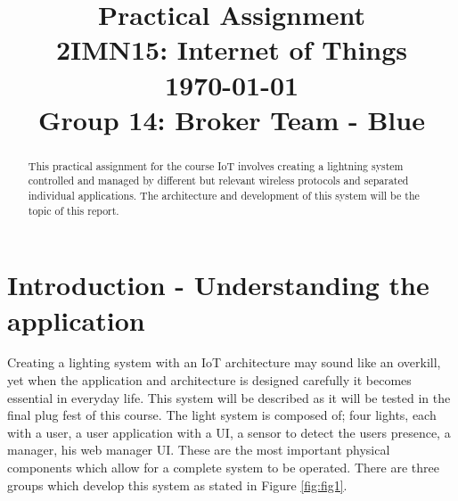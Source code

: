 \documentclass[conference]{IEEEtran}
\begin{document}
\title{Practical Assignment\\ {\fontsize{13}{0}\selectfont 2IMN15: Internet of Things } \\ {\fontsize{13}{0}\selectfont \today }\\{ \fontsize{13}{0}\selectfont Group 14: Broker Team - Blue}}

\author{
	\and
	}
\maketitle

\IEEEpeerreviewmaketitle


\begin{abstract}
	This practical assignment for the course IoT involves creating a lightning system controlled and managed by different but relevant wireless protocols and separated individual applications. The architecture and development of this system will be the topic of this report.\\
	
\end{abstract}


\section{Introduction - Understanding the application}

Creating a lighting system with an IoT architecture may sound like an overkill, yet when the application and architecture is designed carefully it becomes essential in everyday life. This system will be described as it will be tested in the final plug fest of this course. The light system is composed of; four lights, each with a user, a user application with a UI, a sensor to detect the users presence, a manager, his web manager UI. These are the most important physical components which allow for a complete system to be operated. There are three groups which develop this system as stated in Figure \ref{fig:fig1}.
\end{document}
